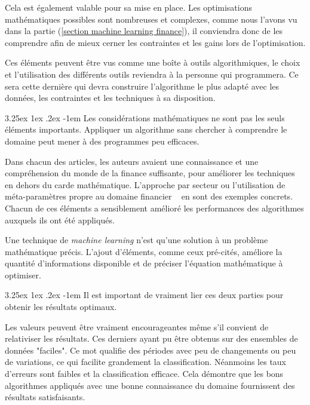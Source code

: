 \documentclass[a4paper, 11pt]{article}
\makeatletter
\renewcommand\paragraph{\@startsection{paragraph}{5}{\z@}%
  {3.25ex \@plus1ex \@minus.2ex}%
  {-1em}%
  {\normalfont\normalsize\bfseries}}
\makeatother
\begin{document}
Cela est également valable pour sa mise en place. Les optimisations mathématiques possibles sont nombreuses et complexes,
comme nous l'avons vu dans la partie (\ref{section machine learning finance}), il conviendra donc de les comprendre afin de
mieux cerner les contraintes et les gains lors de l'optimisation.

Ces éléments peuvent être vus comme une boîte à outils algorithmiques, le choix et l'utilisation des différents
outils reviendra à la personne qui programmera. Ce sera cette dernière qui devra construire l'algorithme le plus
adapté avec les données, les contraintes et les techniques à sa disposition.

\paragraph{}
Les considérations mathématiques ne sont pas les seuls éléments importants. Appliquer un algorithme sans chercher à comprendre
le domaine peut mener à des programmes peu efficaces.

Dans chacun des articles, les auteurs avaient une connaissance et une compréhension du monde de la finance suffisante,
pour améliorer les techniques en dehors du carde mathématique. L'approche par secteur \cite{machine_learning_automated_trading}
ou l'utilisation de méta-paramètres propre au domaine financier ~\cite{fx_trading} en sont des exemples concrets.
Chacun de ces éléments a sensiblement amélioré les performances des algorithmes auxquels ils ont été appliqués.

Une technique de \textit{machine learning} n'est qu'une solution à un problème mathématique précis. L'ajout d'éléments,
comme ceux pré-cités, améliore la quantité d'informations disponible et de préciser l'équation mathématique à optimiser.

\paragraph{}
Il est important de vraiment lier ces deux parties pour obtenir les résultats optimaux.

Les valeurs peuvent être vraiment encourageantes même s'il convient de relativiser les résultats. Ces derniers ayant pu
être obtenus sur des ensembles de données "faciles". Ce mot qualifie des périodes avec peu de changements ou peu de
variations, ce qui facilite grandement la classification.
Néanmoins les taux d'erreurs sont faibles et la classification efficace.
Cela démontre que les bons algorithmes appliqués avec une bonne connaissance du domaine fournissent des résultats satisfaisants. 
\end{document}
